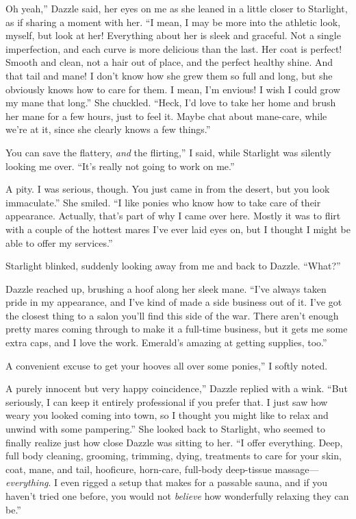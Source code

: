 \leavevmode{}Oh yeah,” Dazzle said, her eyes on me as she leaned in a little closer to Starlight, as if sharing a moment with her. “I mean, I may be more into the athletic look, myself, but look at her! Everything about her is sleek and graceful. Not a single imperfection, and each curve is more delicious than the last. Her coat is perfect! Smooth and clean, not a hair out of place, and the perfect healthy shine. And that tail and mane! I don’t know how she grew them so full and long, but she obviously knows how to care for them. I mean, I’m envious! I wish I could grow my mane that long.” She chuckled. “Heck, I’d love to take her home and brush her mane for a few hours, just to feel it. Maybe chat about mane-care, while we’re at it, since she clearly knows a few things.”

\leavevmode{}You can save the flattery, \textit{and} the flirting,” I said, while Starlight was silently looking me over. “It’s really not going to work on me.”

\leavevmode{}A pity. I was serious, though. You just came in from the desert, but you look immaculate.” She smiled. “I like ponies who know how to take care of their appearance. Actually, that’s part of why I came over here. Mostly it was to flirt with a couple of the hottest mares I’ve ever laid eyes on, but I thought I might be able to offer my services.”

Starlight blinked, suddenly looking away from me and back to Dazzle. “What?”

Dazzle reached up, brushing a hoof along her sleek mane. “I’ve always taken pride in my appearance, and I’ve kind of made a side business out of it. I’ve got the closest thing to a salon you’ll find this side of the war. There aren’t enough pretty mares coming through to make it a full-time business, but it gets me some extra caps, and I love the work. Emerald’s amazing at getting supplies, too.”

\leavevmode{}A convenient excuse to get your hooves all over some ponies,” I softly noted.

\leavevmode{}A purely innocent but very happy coincidence,” Dazzle replied with a wink. “But seriously, I can keep it entirely professional if you prefer that. I just saw how weary you looked coming into town, so I thought you might like to relax and unwind with some pampering.” She looked back to Starlight, who seemed to finally realize just how close Dazzle was sitting to her. “I offer everything. Deep, full body cleaning, grooming, trimming, dying, treatments to care for your skin, coat, mane, and tail, hooficure, horn-care, full-body deep-tissue massage—\textit{everything}. I even rigged a setup that makes for a passable sauna, and if you haven’t tried one before, you would not \textit{believe} how wonderfully relaxing they can be.”

